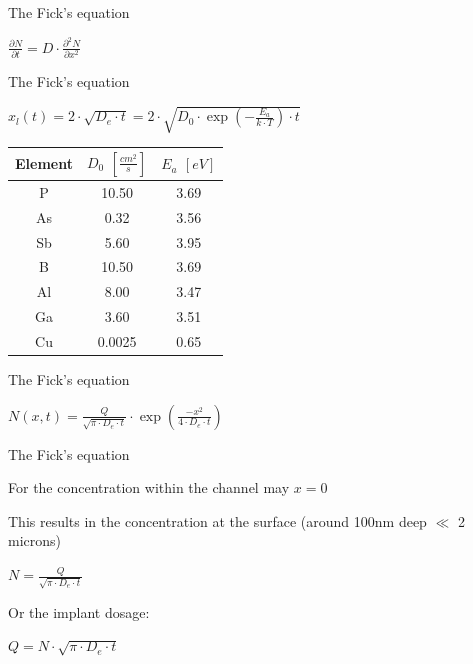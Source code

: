 \documentclass[aspectratio=169]{beamer}
\begin{document}
\begin{frame}{The Fick's equation}
\begin{center}
	\begingroup
	\huge
	$\frac{\partial N}{\partial t} = D \cdot \frac{\partial^2 N}{\partial x^2}$
	\endgroup
\end{center}
\end{frame}


\begin{frame}{The Fick's equation}
\begin{center}
	$x_l(t) = 2 \cdot \sqrt{D_e \cdot t} = 2 \cdot \sqrt{D_0 \cdot \exp\left(-\frac{E_a}{k \cdot T}\right) \cdot t}$ \\
	\begin{tabular}{|c|c|c|}
		\hline
		\textbf{Element} &
		$D_0$ $\left[\frac{cm^2}{s}\right]$ &
		$E_a$ $\left[eV\right]$ \\
		\hline
		\rowcolor{LightCyan}
		P &
		10.50 &
		3.69 \\
		\hline
		As &
		0.32 &
		3.56 \\
		\hline
		Sb &
		5.60 &
		3.95 \\
		\hline
		\rowcolor{LightCyan}
		B &
		10.50 &
		3.69 \\
		\hline
		Al &
		8.00 &
		3.47 \\
		\hline
		Ga &
		3.60 &
		3.51 \\
		\hline
		Cu &
		0.0025 &
		0.65 \\
		\hline
	\end{tabular}
\end{center}
\end{frame}

\begin{frame}{The Fick's equation}
	\begin{center}
		\begingroup
		\huge
		$N(x,t)=\frac{Q}{\sqrt{\pi \cdot D_e \cdot t}} \cdot \exp\left(\frac{-x^2}{4 \cdot D_e \cdot t}\right)$
		\endgroup
	\end{center}
\end{frame}

\begin{frame}{The Fick's equation}
	\begin{center}
		For the concentration within the channel may $x=0$

		This results in the concentration at the surface (around 100nm deep $\ll$ 2 microns)

		$ N = \frac{Q}{\sqrt{\pi \cdot D_e \cdot t}} $

		Or the implant dosage:

		$ Q = N \cdot \sqrt{\pi \cdot D_e \cdot t} $
	\end{center}
\end{frame}
\end{document}
